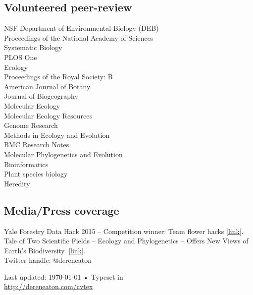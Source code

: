 \documentclass[10pt]{article}
\begin{document}
\subsection*{Volunteered peer-review}
NSF Department of Environmental Biology (DEB)\\
Proceedings of the National Academy of Sciences\\
Systematic Biology\\
PLOS One\\
Ecology\\
Proceedings of the Royal Society: B\\
American Journal of Botany\\
Journal of Biogeography\\
Molecular Ecology\\
Molecular Ecology Resources\\
Genome Research\\
Methods in Ecology and Evolution\\
BMC Research Notes\\
Molecular Phylogenetics and Evolution\\
Bioinformatics\\
Plant species biology\\
Heredity\\

\subsection*{Media/Press coverage}
Yale Forestry Data Hack 2015 -- Competition winner: Team flower hacks [\href{http://epi.yale.edu/the-metric/visualizing-future}{link}].\\
Tale of Two Scientific Fields -- Ecology and Phylogenetics -- Offers New Views of Earth's Biodiversity. [\href{http://nsf.gov/news/news_summ.jsp?cntn_id=125048}{link}].\\
Twitter handle: @dereneaton\\
\vfill





\begin{center}
{\scriptsize  Last updated: \today\- •\- 
Typeset in \href{http://nitens.org/taraborelli/cvtex}{
\XeTeX }\\
\href{http://dereneaton.com/cvtex}{http://dereneaton.com/cvtex}}
\end{center}
\end{document}
